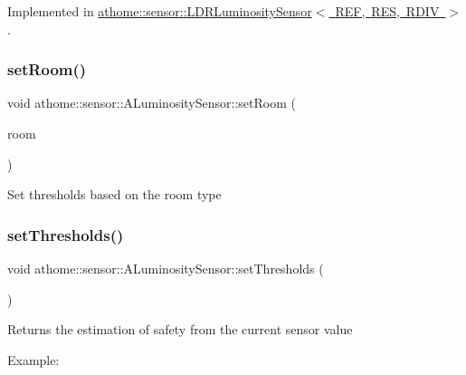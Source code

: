 Implemented in \mbox{\hyperlink{classathome_1_1sensor_1_1_l_d_r_luminosity_sensor_a6e4f25000704564ce30a7e3531f23c43}{athome\+::sensor\+::\+L\+D\+R\+Luminosity\+Sensor$<$ R\+E\+F, R\+E\+S, R\+D\+I\+V $>$}}.

\mbox{\label{classathome_1_1sensor_1_1_a_luminosity_sensor_a297af24d24717c4167840c933b0bbb9a}} 
\subsubsection{\texorpdfstring{set\+Room()}{setRoom()}}
{\footnotesize\ttfamily void athome\+::sensor\+::\+A\+Luminosity\+Sensor\+::set\+Room (\begin{DoxyParamCaption}\item[{A\+Luminosity\+Sensor\+::\+Room\+\_\+\+Type}]{room }\end{DoxyParamCaption})}

Set thresholds based on the room type \mbox{\label{classathome_1_1sensor_1_1_a_luminosity_sensor_aa26ed7176ba600f6900bd249edce71ab}} 
\subsubsection{\texorpdfstring{set\+Thresholds()}{setThresholds()}}
{\footnotesize\ttfamily void athome\+::sensor\+::\+A\+Luminosity\+Sensor\+::set\+Thresholds (\begin{DoxyParamCaption}\item[{const \mbox{\hyperlink{structathome_1_1sensor_1_1_i_sensor_1_1_i_sensor_thresholds}{I\+Sensor\+Thresholds}} \&}]{ }\end{DoxyParamCaption})\hspace{0.3cm}{\ttfamily [virtual]}}

Returns the estimation of safety from the current sensor value

Example\+:


